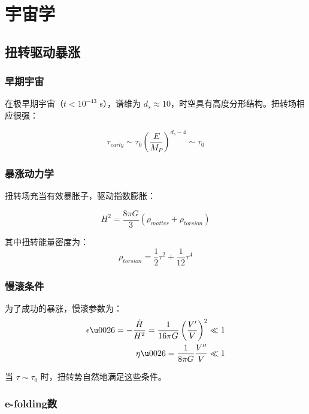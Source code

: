 \section{宇宙学}
\label{sec:cosmology}

\subsection{扭转驱动暴涨}

\subsubsection{早期宇宙}

在极早期宇宙（$t < 10^{-43}$ s），谱维为 $d_s \approx 10$，时空具有高度分形结构。扭转场相应很强：

\begin{equation}
    \tau_{early} \sim \tau_0 \left(\frac{E}{M_P}\right)^{d_s - 4} \sim \tau_0
\end{equation}

\subsubsection{暴涨动力学}

扭转场充当有效暴胀子，驱动指数膨胀：

\begin{equation}
    H^2 = \frac{8\pi G}{3}\left(\rho_{matter} + \rho_{torsion}\right)
\end{equation}

其中扭转能量密度为：
\begin{equation}
    \rho_{torsion} = \frac{1}{2}\tau^2 + \frac{1}{12}\tau^4
\end{equation}

\subsubsection{慢滚条件}

为了成功的暴涨，慢滚参数为：
\begin{align}
    \epsilon \u0026= -\frac{\dot{H}}{H^2} = \frac{1}{16\pi G}\left(\frac{V'}{V}\right)^2 \ll 1 \\
    \eta \u0026= \frac{1}{8\pi G}\frac{V''}{V} \ll 1
\end{align}

当 $\tau \sim \tau_0$ 时，扭转势自然地满足这些条件。

\subsubsection{e-folding数}

